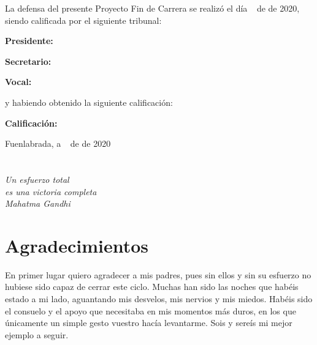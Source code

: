 \documentclass[a4paper, 12pt]{book}
\begin{document}
\vspace{1cm}
La defensa del presente Proyecto Fin de Carrera se realizó el día \qquad$\;\,$ de \qquad\qquad\qquad\qquad \newline de 2020, siendo calificada por el siguiente tribunal:


\vspace{0.5cm}
\textbf{Presidente:}

\vspace{1.2cm}
\textbf{Secretario:}

\vspace{1.2cm}
\textbf{Vocal:}


\vspace{1.2cm}
y habiendo obtenido la siguiente calificación:

\vspace{1cm}
\textbf{Calificación:}


\vspace{1cm}
\begin{flushright}
Fuenlabrada, a \qquad$\;\,$ de \qquad\qquad\qquad\qquad de 2020
\end{flushright}


\chapter*{}
\begin{flushright}
\textit{Un esfuerzo total \\
es una victoria completa \\
Mahatma Gandhi} 
\end{flushright}


\chapter*{Agradecimientos}

En primer lugar quiero agradecer a mis padres, pues sin ellos y sin su esfuerzo no hubiese sido capaz de cerrar este ciclo. Muchas han sido las noches que habéis estado a mi lado, aguantando mis desvelos, mis nervios y mis miedos. Habéis sido el consuelo y el apoyo que necesitaba en mis momentos más duros, en los que únicamente un simple gesto vuestro hacía levantarme. Sois y sereís mi mejor ejemplo a seguir. 
\end{document}
